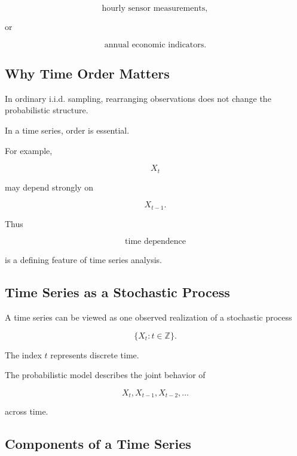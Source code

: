\[
\boxed{
\text{hourly sensor measurements},
}
\]

or

\[
\boxed{
\text{annual economic indicators}.
}
\]

\subsection{Why Time Order Matters}
\label{subsec:why-time-order-matters}

In ordinary i.i.d. sampling, rearranging observations does not change
the probabilistic structure.

In a time series, order is essential.

For example,

\[
X_t
\]

may depend strongly on

\[
X_{t-1}.
\]

Thus

\[
\boxed{
\text{time dependence}
}
\]

is a defining feature of time series analysis.

\subsection{Time Series as a Stochastic Process}
\label{subsec:time-series-stochastic-process}

A time series can be viewed as one observed realization of a stochastic
process

\[
\boxed{
\{X_t:t\in\mathbb{Z}\}.
}
\]

The index \(t\) represents discrete time.

The probabilistic model describes the joint behavior of

\[
X_t,
X_{t-1},
X_{t-2},
\ldots
\]

across time.

\subsection{Components of a Time Series}
\label{subsec:time-series-components}

